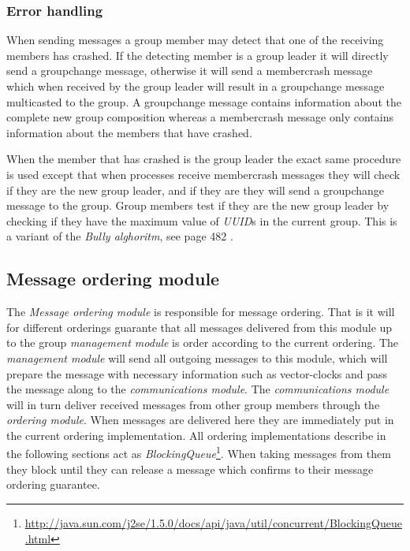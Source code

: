 \documentclass[titlepage, twocolumn, a4paper, 10pt]{article}
\begin{document}
\subsubsection{Error handling}\label{sec:error-handling}
When sending messages a group member may detect that one of the
receiving members has crashed. If the detecting member is a group
leader it will directly send a groupchange message, otherwise it will
send a membercrash message which when received by the group leader
will result in a groupchange message multicasted to the group. A
groupchange message contains information about the complete new group
composition whereas a membercrash message only contains information
about the members that have crashed.

When the member that has crashed is the group leader the exact same procedure is used except that when processes receive membercrash messages they will check if they are the new group leader, and if they are they will send a groupchange message to the group. Group members test if they are the new group leader by checking if they have the maximum value of \textit{UUID}s in the current group. This is a variant of the \textit{Bully alghoritm}, see page 482 \cite{book:dist-syst}.


\subsection{Message ordering module}\label{sec:message-ordering-module}
The \textit{Message ordering module} is responsible for message
ordering. That is it will for different orderings guarante that all
messages delivered from this module up to the group \textit{management
  module} is order according to the current ordering. The
\textit{management module} will send all outgoing messages to this
module, which will prepare the message with necessary information such
as vector-clocks and pass the message along to the
\textit{communications module}. The \textit{communications module}
will in turn deliver received messages from other group members
through the \textit{ordering module}. When messages are delivered here
they are immediately put in the current ordering implementation. All
ordering implementations describe in the following sections act as
\textit{BlockingQueue}\footnote{\url{http://java.sun.com/j2se/1.5.0/docs/api/java/util/concurrent/BlockingQueue.html}}.
When taking messages from them they block until they can release a
message which confirms to their message ordering guarantee.
\end{document}
